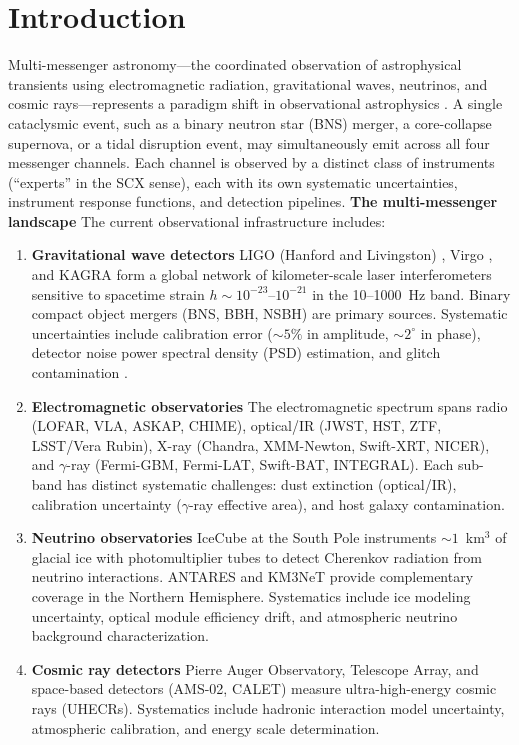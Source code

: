 \documentclass[11pt,a4paper]{article}
\theoremstyle{definition}
\newcommand{\SCX}{\textsc{SCX}}
\begin{document}
\section{Introduction}
\label{sec:introduction}
Multi-messenger astronomy---the coordinated observation of astrophysical transients using electromagnetic radiation, gravitational waves, neutrinos, and cosmic rays---represents a paradigm shift in observational astrophysics \cite{Bartos2013,Meszaros2019}. A single cataclysmic event, such as a binary neutron star (BNS) merger, a core-collapse supernova, or a tidal disruption event, may simultaneously emit across all four messenger channels. Each channel is observed by a distinct class of instruments (``experts'' in the \SCX{} sense), each with its own systematic uncertainties, instrument response functions, and detection pipelines.
\textbf{The multi-messenger landscape} The current observational infrastructure includes:
\begin{enumerate}[label=(\roman*)]
    \item \textbf{Gravitational wave detectors} LIGO (Hanford and Livingston) \cite{LIGO2015}, Virgo \cite{Virgo2015}, and KAGRA \cite{KAGRA2019} form a global network of kilometer-scale laser interferometers sensitive to spacetime strain $h \sim 10^{-23}$--$10^{-21}$ in the 10--1000~Hz band. Binary compact object mergers (BNS, BBH, NSBH) are primary sources. Systematic uncertainties include calibration error ($\sim 5\%$ in amplitude, $\sim 2^\circ$ in phase), detector noise power spectral density (PSD) estimation, and glitch contamination \cite{LIGOcalibration2021}.
    \item \textbf{Electromagnetic observatories} The electromagnetic spectrum spans radio (LOFAR, VLA, ASKAP, CHIME), optical/IR (JWST, HST, ZTF, LSST/Vera Rubin), X-ray (Chandra, XMM-Newton, Swift-XRT, NICER), and $\gamma$-ray (Fermi-GBM, Fermi-LAT, Swift-BAT, INTEGRAL). Each sub-band has distinct systematic challenges: dust extinction (optical/IR), calibration uncertainty ($\gamma$-ray effective area), and host galaxy contamination.
    \item \textbf{Neutrino observatories} IceCube \cite{IceCube2017} at the South Pole instruments $\sim 1$~km$^3$ of glacial ice with photomultiplier tubes to detect Cherenkov radiation from neutrino interactions. ANTARES and KM3NeT provide complementary coverage in the Northern Hemisphere. Systematics include ice modeling uncertainty, optical module efficiency drift, and atmospheric neutrino background characterization.
    \item \textbf{Cosmic ray detectors} Pierre Auger Observatory, Telescope Array, and space-based detectors (AMS-02, CALET) measure ultra-high-energy cosmic rays (UHECRs). Systematics include hadronic interaction model uncertainty, atmospheric calibration, and energy scale determination.
\end{enumerate}
\end{document}
